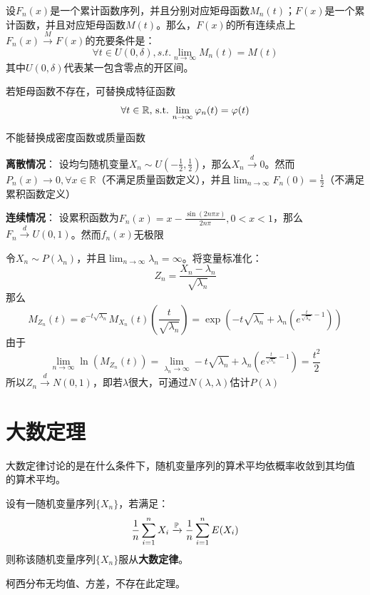 \begin{theorem}[连续性定理]\label{thm:continuity}
    设$F_n(x)$是一个累计函数序列，并且分别对应矩母函数$M_n(t)$；$F(x)$是一个累计函数，并且对应矩母函数$M(t)$。那么，$F(x)$的所有连续点上$F_n(x) \xrightarrow{M} F(x)$的充要条件是：
    \[ \forall t \in U(0,\delta) ,s.t. \lim_{n \to \infty}M_n(t) = M(t)\]
    其中$U(0,\delta)$代表某一包含零点的开区间。

    若矩母函数不存在，可替换成特征函数
    \[ \forall t \in \mathbb{R} ,\st \lim_{n \to \infty}\varphi_n(t) = \varphi(t)\]
\end{theorem}
\begin{remark}
    不能替换成密度函数或质量函数
\end{remark}

\begin{example}
    \textbf{离散情况}：
    设均匀随机变量$X_n \sim U(-\frac1{2},\frac1{2})$，那么$X_n \xrightarrow{d} 0$。然而$P_n(x) \to 0, \forall x \in \mathbb{R}$（不满足质量函数定义），并且$\lim_{n \to \infty}F_n(0)=\frac1{2}$（不满足累积函数定义）

    \textbf{连续情况}：
    设累积函数为$F_n(x)=x-\frac{\sin(2n\pi x)}{2n\pi}, 0<x<1$，那么$F_n \xrightarrow{d} U(0,1)$。然而$f_n(x)$无极限
\end{example}

\begin{example}[泊松分布收敛于正态分布]
    令$X_n \sim P(\lambda_n)$，并且$\lim_{n \to \infty}\lambda_n =\infty$。将变量标准化：
    \[ Z_n=\frac{X_n-\lambda_n}{\sqrt{\lambda_n}} \]
    那么
    \[M_{Z_n}(t)=\ee^{-t\sqrt{\lambda_n}}M_{X_n}(t)(\frac{t}{\sqrt{\lambda_n}})=\exp(-t\sqrt{\lambda_n}+\lambda_n(e^{\frac{t}{\sqrt{\lambda_n}}-1}))\]
    由于
    \[ \lim_{n \to \infty}\ln(M_{Z_n}(t))=\lim_{\lambda_n \to \infty}-t\sqrt{\lambda_n}+\lambda_n(e^{\frac{t}{\sqrt{\lambda_n}}-1})=\frac{t^2}{2} \]
    所以$Z_n \xrightarrow{d} N(0,1)$，即若$\lambda$很大，可通过$N(\lambda,\lambda)$估计$P(\lambda)$
\end{example}

\section{大数定理}\label{sec:large_number}

大数定律讨论的是在什么条件下，随机变量序列的算术平均依概率收敛到其均值
的算术平均。

\begin{definition}[大数定律的一般形式]\label{def:large_number_law}
    设有一随机变量序列$\{ X_n \}$，若满足：
    \[ \frac1n \sum_{i=1}^n X_i \xrightarrow{\P} \frac1n \sum_{i=1}^n E(X_i) \]
    则称该随机变量序列$\{ X_n \}$服从\textbf{大数定律}。
\end{definition}
\begin{note}
    柯西分布无均值、方差，不存在此定理。
\end{note}

